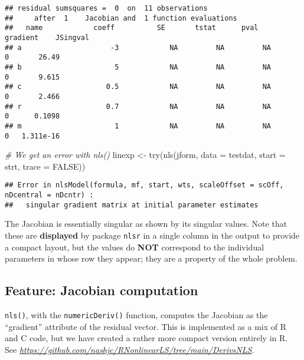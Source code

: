 \documentclass[
]{article}
\newenvironment{Shaded}{\begin{snugshade}}{\end{snugshade}}
\newcommand{\AttributeTok}[1]{\textcolor[rgb]{0.77,0.63,0.00}{#1}}
\newcommand{\CommentTok}[1]{\textcolor[rgb]{0.56,0.35,0.01}{\textit{#1}}}
\newcommand{\ConstantTok}[1]{\textcolor[rgb]{0.00,0.00,0.00}{#1}}
\newcommand{\FunctionTok}[1]{\textcolor[rgb]{0.00,0.00,0.00}{#1}}
\newcommand{\NormalTok}[1]{#1}
\newcommand{\OtherTok}[1]{\textcolor[rgb]{0.56,0.35,0.01}{#1}}
\begin{document}
\begin{verbatim}
## residual sumsquares =  0  on  11 observations
##     after  1    Jacobian and  1 function evaluations
##   name            coeff          SE       tstat      pval      gradient    JSingval   
## a                     -3            NA         NA         NA           0       26.49  
## b                      5            NA         NA         NA           0       9.615  
## c                    0.5            NA         NA         NA           0       2.466  
## r                    0.7            NA         NA         NA           0      0.1098  
## m                      1            NA         NA         NA           0   1.311e-16
\end{verbatim}

\begin{Shaded}
\begin{Highlighting}[]
\CommentTok{\# We get an error with nls()}
\NormalTok{linexp }\OtherTok{\textless{}{-}} \FunctionTok{try}\NormalTok{(}\FunctionTok{nls}\NormalTok{(jform, }\AttributeTok{data =}\NormalTok{ testdat, }\AttributeTok{start =}\NormalTok{ strt, }\AttributeTok{trace =} \ConstantTok{FALSE}\NormalTok{))}
\end{Highlighting}
\end{Shaded}

\begin{verbatim}
## Error in nlsModel(formula, mf, start, wts, scaleOffset = scOff, nDcentral = nDcntr) : 
##   singular gradient matrix at initial parameter estimates
\end{verbatim}

The Jacobian is essentially singular as shown by its singular values.
Note that these are \textbf{displayed} by package \texttt{nlsr} in a
single column in the output to provide a compact layout, but the values
do \textbf{NOT} correspond to the individual parameters in whose row
they appear; they are a property of the whole problem.

\hypertarget{feature-jacobian-computation}{%
\subsection{Feature: Jacobian
computation}\label{feature-jacobian-computation}}

\texttt{nls()}, with the \texttt{numericDeriv()} function, computes the
Jacobian as the ``gradient'' attribute of the residual vector. This is
implemented as a mix of R and C code, but we have created a rather more
compact version entirely in R. See
\emph{\url{https://github.com/nashjc/RNonlinearLS/tree/main/DerivsNLS}}.
\end{document}

